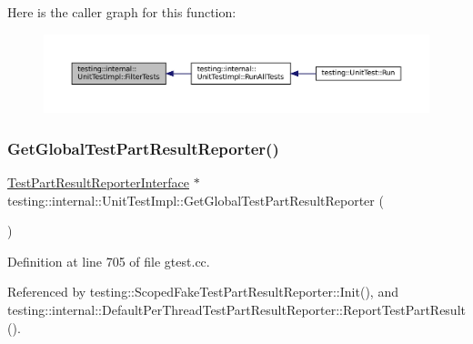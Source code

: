 Here is the caller graph for this function\+:
\nopagebreak
\begin{figure}[H]
\begin{center}
\leavevmode
\includegraphics[width=350pt]{classtesting_1_1internal_1_1UnitTestImpl_abd47e447f0c2557ed528db0350671bed_icgraph}
\end{center}
\end{figure}
\mbox{\label{classtesting_1_1internal_1_1UnitTestImpl_a1cd291fd6751654924362164735d4b49}} 
\subsubsection{\texorpdfstring{Get\+Global\+Test\+Part\+Result\+Reporter()}{GetGlobalTestPartResultReporter()}}
{\footnotesize\ttfamily \hyperlink{classtesting_1_1TestPartResultReporterInterface}{Test\+Part\+Result\+Reporter\+Interface} $\ast$ testing\+::internal\+::\+Unit\+Test\+Impl\+::\+Get\+Global\+Test\+Part\+Result\+Reporter (\begin{DoxyParamCaption}{ }\end{DoxyParamCaption})}



Definition at line 705 of file gtest.\+cc.



Referenced by testing\+::\+Scoped\+Fake\+Test\+Part\+Result\+Reporter\+::\+Init(), and testing\+::internal\+::\+Default\+Per\+Thread\+Test\+Part\+Result\+Reporter\+::\+Report\+Test\+Part\+Result().


